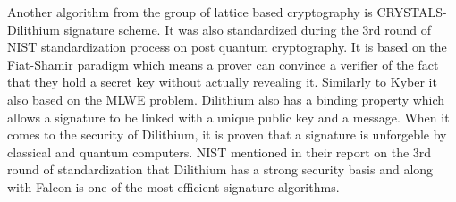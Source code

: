 Another algorithm from the group of lattice based cryptography is CRYSTALS-Dilithium signature scheme. It was also standardized during the 3rd round of NIST standardization process on post quantum cryptography. It is based on the Fiat-Shamir paradigm which means a prover can convince a verifier of the fact that they hold a secret key without actually revealing it. Similarly to Kyber it also based on the MLWE problem. Dilithium also has a binding property which allows a signature to be linked with a unique public key and a message. When it comes to the security of Dilithium, it is proven that a signature is unforgeble by classical and quantum computers. NIST mentioned in their report on the 3rd round of standardization that Dilithium has a strong security basis and along with Falcon is one of the most efficient signature algorithms. \cite{Alagic2022}